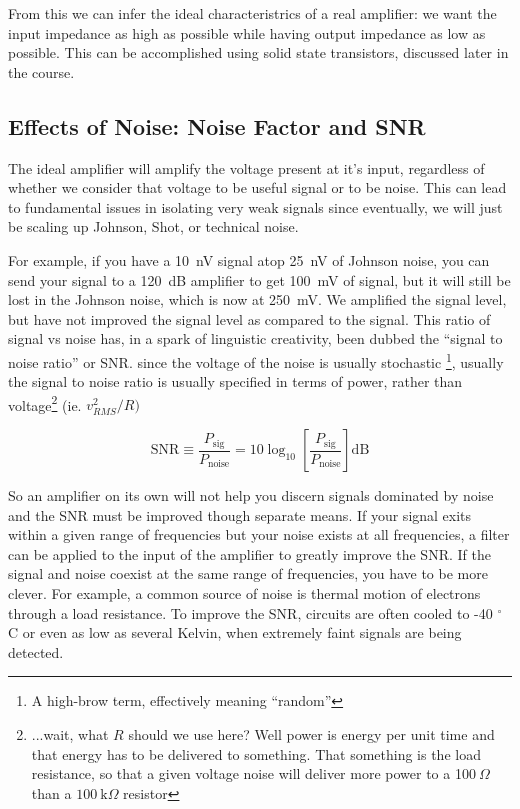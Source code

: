 \documentclass[]{article}
\begin{document}
From this we can infer the ideal characteristrics of a real amplifier: we want the input impedance as high as possible while having output impedance as low as possible. This can be accomplished using solid state transistors, discussed later in the course. 

\subsection{Effects of Noise: Noise Factor and SNR}
The ideal amplifier will amplify the voltage present at it's input, regardless of whether we consider that voltage to be useful signal or to be noise. This can lead to fundamental issues in isolating very weak signals since eventually, we will just be scaling up Johnson, Shot, or technical noise. 

For example, if you have a 10~nV signal atop 25~nV of Johnson noise, you can send your signal to a 120~dB amplifier to get 100~mV of signal, but it will still be lost in the Johnson noise, which is now at 250~mV.  We amplified the signal level, but have not improved the signal level as compared to the signal. This ratio of signal vs noise has, in a spark of linguistic creativity, been dubbed the ``signal to noise ratio'' or SNR. since the voltage of the noise is usually stochastic \footnote{ A high-brow term, effectively meaning ``random''}, usually the signal to noise ratio is usually specified in terms of power, rather than voltage\footnote{ ...wait, what $R$ should we use here? Well power is energy per unit time and that energy has to be delivered to something. That something is the load resistance, so that a given voltage noise will deliver more power to a 1$00~\Omega$ than a $100~\text{k}\Omega$ resistor} (ie. $v_{RMS}^2/R)$

\begin{equation}
\label{eq:def_snr}
\text{SNR} \equiv \frac{P_\text{sig}}{P_\text{noise}} = 10\log_{10}\left[\frac{P_\text{sig}}{P_\text{noise}}\right] \text{dB}
\end{equation}

So an amplifier on its own will not help you discern signals dominated by noise and the SNR must be improved though separate means. If your signal exits within a given range of frequencies but your noise exists at all frequencies, a filter can be applied to the input of the amplifier to greatly improve the SNR. If the  signal and noise coexist at the same range of frequencies, you have to be more clever. For example, a common source of noise is thermal motion of electrons through a load resistance. To improve the SNR, circuits are often cooled to -40 $^\circ$C or even as low as several Kelvin, when extremely faint signals are being detected.
\end{document}

